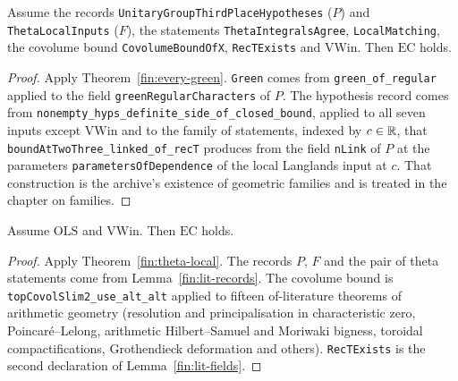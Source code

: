 \begin{theorem}\label{fin:theta-local}
Assume the records \texttt{UnitaryGroupThirdPlaceHypotheses} ($P$) and
\texttt{ThetaLocalInputs} ($F$), the statements \texttt{ThetaIntegralsAgree},
\texttt{LocalMatching}, the covolume bound \texttt{CovolumeBoundOfX},
\texttt{RecTExists} and $\mathrm{VWin}$. Then $\mathrm{EC}$ holds.
\end{theorem}
\begin{proof}
Apply Theorem~\ref{fin:every-green}. \texttt{Green} comes from
\texttt{green\_of\_regular} applied to the field
\texttt{greenRegularCharacters} of $P$. The hypothesis record comes from
\texttt{nonempty\_hyps\_definite\_side\_of\_closed\_bound}, applied to all seven
inputs except $\mathrm{VWin}$ and to the family of statements, indexed by
$c\in\mathbb{R}$, that \texttt{boundAtTwoThree\_linked\_of\_recT} produces from the field
\texttt{nLink} of $P$ at the parameters \texttt{parametersOfDependence} of the
local Langlands input at $c$. That construction is the archive's existence of
geometric families and is treated in the chapter on families.
\end{proof}

\begin{theorem}\label{fin:every-lit-vwin}
Assume $\mathrm{OLS}$ and $\mathrm{VWin}$. Then $\mathrm{EC}$ holds.
\end{theorem}
\begin{proof}
Apply Theorem~\ref{fin:theta-local}. The records $P$, $F$ and the pair of
theta statements come from Lemma~\ref{fin:lit-records}. The covolume bound is
\texttt{topCovolSlim2\_use\_alt\_alt} applied to fifteen of-literature theorems
of arithmetic geometry (resolution and principalisation in characteristic zero,
Poincar\'e--Lelong, arithmetic Hilbert--Samuel and Moriwaki bigness,
toroidal compactifications, Grothendieck deformation and others).
\texttt{RecTExists} is the second declaration of Lemma~\ref{fin:lit-fields}.
\end{proof}

